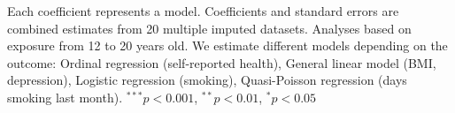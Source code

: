 \begin{table}[htp]
\begin{center}
\begin{threeparttable}
\begin{tabular}{l D{.}{.}{4.3} D{.}{.}{4.5} D{.}{.}{4.3} D{.}{.}{4.5} D{.}{.}{4.5} }
\end{tabular}
\begin{tablenotes}
\scriptsize
\item Each coefficient represents a model. Coefficients and standard errors are combined estimates from 20 multiple imputed datasets. Analyses based on exposure from 12 to 20 years old. We estimate different models depending on the outcome: Ordinal regression (self-reported health), General linear model (BMI, depression), Logistic regression (smoking), Quasi-Poisson regression (days smoking last month). $^{***}p<0.001$, $^{**}p<0.01$, $^*p<0.05$
\end{tablenotes}
\label{tab:nlsy97_z_models}
\end{threeparttable}
\end{center}
\end{table}
